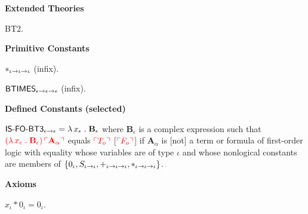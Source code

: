 \begin{biformthy}\em

\bi

  \item[]

  \item[] \textbf{Extended Theories} 

  \be

    \setcounter{enumi}{1}

    \item BT2.

  \ee

  \item[] \textbf{Primitive Constants}

  \be

    \setcounter{enumi}{4}

    \item $*_{\iota \rightarrow \iota \rightarrow \iota}$ (infix).

    \item $\mbox{\sf BTIMES}_{\epsilon \rightarrow \epsilon \rightarrow \epsilon}$ (infix).

  \ee

  \item[] \textbf{Defined Constants (selected)}

  \be

    \setcounter{enumi}{3}

    \item $\mbox{\sf IS-FO-BT3}_{\epsilon \rightarrow \epsilon} = \lambda\,
      x_\epsilon \mathrel. \textbf{B}_\epsilon$ {\sglsp} where
      $\textbf{B}_\epsilon$ is a complex expression such that
      $\textcolor{red}{(\lambda\, x_\epsilon \mathrel. \textbf{B}_\epsilon) \,
        \ulcorner\textbf{A}_\alpha\urcorner}$ equals $\textcolor{red}{\ulcorner T_o\urcorner}$
      [$\textcolor{red}{\ulcorner F_o\urcorner}$] if $\textbf{A}_\alpha$ is [not] a term
      or formula of first-order logic with equality whose variables
      are of type $\iota$ and whose nonlogical constants are members
      of ${\{ 0_\iota,S_{\iota \rightarrow \iota},+_{\iota \rightarrow \iota
          \rightarrow \iota},*_{\iota \rightarrow \iota \rightarrow \iota} \}}$.

  \ee

  \item[] \textbf{Axioms}

  \be

    \setcounter{enumi}{15}

    \item $x_\iota * 0_\iota = 0_\iota$.


\end{biformthy}
